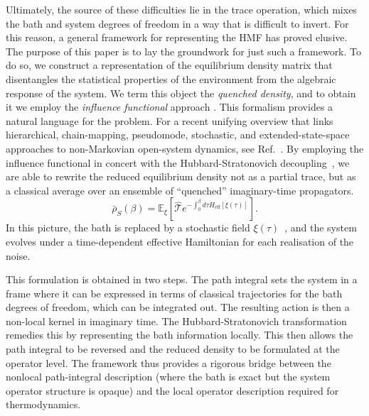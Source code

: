\documentclass[aps,prl,twocolumn,superscriptaddress,showpacs,floatfix]{revtex4-2}
\begin{document}
Ultimately, the source of these difficulties lie in the trace operation, which mixes the bath and system degrees of freedom in a way that is difficult to invert. For this reason, a general framework for representing the HMF has proved elusive. The purpose of this paper is to lay the groundwork for just such a framework. To do so, we construct a representation of the equilibrium density matrix that disentangles the statistical properties of the environment from the algebraic response of the system. We term this object the \emph{quenched density}, and to obtain it we employ the \emph{influence functional} approach \cite{feynmanTheoryGeneralQuantum1963a,caldeiraQuantumTunnellingDissipative1983a,grabertQuantumBrownianMotion1988}. This formalism provides a natural language for the problem. For a recent unifying overview that links hierarchical, chain-mapping, pseudomode, stochastic, and extended-state-space approaches to non-Markovian open-system dynamics, see Ref.~\cite{XuVadimovStockburgerAnkerhold2026}. By employing the influence functional in concert with the Hubbard-Stratonovich decoupling~\cite{hubbardCalculationPartitionFunctions1959a,stratonovich1957QDistro,stockburgerExactNumberRepresentation2002}, we are able to rewrite the reduced equilibrium density not as a partial trace, but as a classical average over an ensemble of ``quenched'' imaginary-time propagators.
\begin{equation}
    \bar{\rho}_S(\beta) = \mathbb{E}_{\xi}\left[ \hat{\mathcal{T}} e^{-\int_0^\beta d\tau H_{\mathrm{eff}}[\xi(\tau)]} \right].
\end{equation}
In this picture, the bath is replaced by a stochastic field $\xi(\tau)$~\cite{stockburgerSimulatingSpinbosonDynamics2004,mccaulPartitionfreeApproachOpen2017c,wiedmannNonMarkovianDynamicsQuantum2020,laneExactlyThermalizedQuantum2020,matosEfficientChoiceColored2020,matosStochasticEntropyProduction2022}, and the system evolves under a time-dependent effective Hamiltonian for each realisation of the noise.

This formulation is obtained in two steps. The path integral sets the system in a frame where it can be expressed in terms of classical trajectories for the bath degrees of freedom, which can be integrated out. The resulting action is then a non-local kernel in imaginary time. The Hubbard-Stratonovich transformation remedies this by representing the bath information locally. This then allows the path integral to be reversed and the reduced density to be formulated at the operator level. The framework thus provides a rigorous bridge between the nonlocal path-integral description (where the bath is exact but the system operator structure is opaque) and the local operator description required for thermodynamics.
\end{document}
